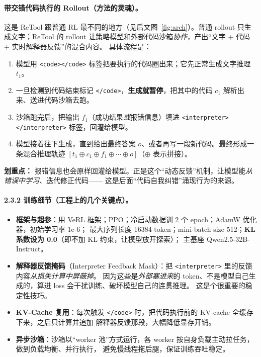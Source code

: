 \documentclass[11pt,UTF8,fontset=fandol]{ctexart}
\begin{document}
\paragraph{带交错代码执行的 Rollout（方法的灵魂）。} 这是 ReTool 跟普通 RL 最不同的地方（见后文图~\ref{fig:arch}）。普通 rollout
只生成文字；ReTool 的 rollout 让策略模型和外部代码沙箱\emph{协作}，产出“文字 + 代码 + 实时解释器反馈”的混合内容。
具体流程是：
\begin{enumerate}[leftmargin=1.8em,itemsep=1pt]
  \item 模型用 \verb|<code></code>| 标签把要执行的代码圈出来；它先正常生成文字推理 $t_1$。
  \item 一旦检测到代码结束标记 \verb|</code>|，\textbf{生成就暂停}，把其中的代码 $c_1$ 解析出来、送进代码沙箱去跑。
  \item 沙箱跑完后，把输出 $f_1$（成功结果\emph{或}报错信息）填进 \verb|<interpreter></interpreter>| 标签，回灌给模型。
  \item 模型接着往下生成，直到给出最终答案 $o$、或者再写一段新代码。最终形成一条混合推理轨迹
  $[t_1\oplus c_1\oplus f_1\oplus\cdots\oplus o]$（$\oplus$ 表示拼接）。
\end{enumerate}
\textbf{划重点：} 报错信息也会原样回灌给模型。正是这个“动态反馈”机制，让模型能\emph{从错误中学习}、迭代修正代码——
这是后面“代码自我纠错”涌现行为的来源。

\paragraph{2.3.2 训练细节（工程上的几个关键点）。}
\begin{itemize}[leftmargin=1.6em,itemsep=1pt]
  \item \textbf{框架与超参}：用 VeRL 框架；PPO；冷启动数据训 2 个 epoch；AdamW 优化器，初始学习率 $1\text{e-}6$；
  最大序列长度 16384 token；mini-batch size 512；\textbf{KL 系数设为 0.0}（即不加 KL 约束，让模型放开探索）；
  主基座 Qwen2.5-32B-Instruct。
  \item \textbf{解释器反馈掩码}（Interpreter Feedback Mask）：把 \verb|<interpreter>| 里的反馈内容\emph{从损失计算中屏蔽掉}。
  因为这些是\emph{外部塞进来}的 token、不是模型自己生成的，算进 loss 会干扰训练、破坏模型自己的连贯推理。
  这是个很重要的稳定性技巧。
  \item \textbf{KV-Cache 复用}：每次触发 \verb|</code>| 时，把代码执行前的 KV-cache 全缓存下来，之后只计算并追加
  解释器反馈那段，大幅降低显存开销。
  \item \textbf{异步沙箱}：沙箱以“worker 池”方式运行，各 worker 按自身负载主动拉任务，做到负载均衡、并行执行，
  避免慢线程拖后腿，保证训练吞吐稳定。
\end{itemize}
\end{document}
